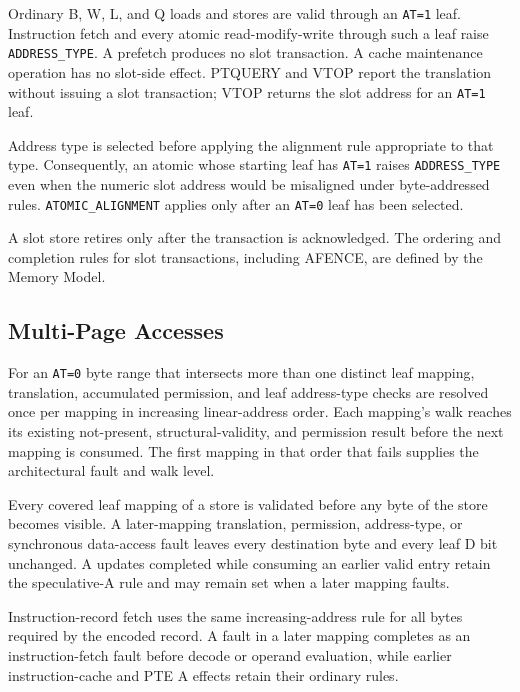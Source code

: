 Ordinary B, W, L, and Q loads and stores are valid through an \texttt{AT=1} leaf. Instruction fetch and every atomic
read-modify-write through such a leaf raise \texttt{ADDRESS\_TYPE}. A prefetch produces no slot transaction. A cache
maintenance operation has no slot-side effect. PTQUERY and VTOP report the translation without issuing a slot
transaction; VTOP returns the slot address for an \texttt{AT=1} leaf.

Address type is selected before applying the alignment rule appropriate to that type. Consequently, an atomic whose
starting leaf has \texttt{AT=1} raises \texttt{ADDRESS\_TYPE} even when the numeric slot address would be misaligned
under byte-addressed rules. \texttt{ATOMIC\_ALIGNMENT} applies only after an \texttt{AT=0} leaf has been selected.

A slot store retires only after the transaction is acknowledged. The ordering and completion rules for slot
transactions, including AFENCE, are defined by the Memory Model.

\subsection{Multi-Page Accesses}
For an \texttt{AT=0} byte range that intersects more than one distinct leaf mapping, translation, accumulated
permission, and leaf address-type checks are resolved once per mapping in increasing linear-address order. Each
mapping's walk reaches its existing not-present, structural-validity, and permission result before the next mapping
is consumed. The first mapping in that order that fails supplies the architectural fault and walk level.

Every covered leaf mapping of a store is validated before any byte of the store becomes visible. A later-mapping translation,
permission, address-type, or synchronous data-access fault leaves every destination byte and every leaf D bit
unchanged. A updates completed while consuming an earlier valid entry retain the speculative-A rule and may remain
set when a later mapping faults.

Instruction-record fetch uses the same increasing-address rule for all bytes required by the encoded record. A fault
in a later mapping completes as an instruction-fetch fault before decode or operand evaluation, while earlier
instruction-cache and PTE A effects retain their ordinary rules.
